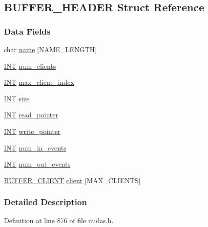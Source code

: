 \subsection{BUFFER\_\-HEADER Struct Reference}
\label{structBUFFER__HEADER}
\subsubsection*{Data Fields}
\begin{DoxyCompactItemize}
\item 
char \hyperlink{structBUFFER__HEADER_a40ea1b56ee55965c4d61e6da5ae57022}{name} \mbox{[}NAME\_\-LENGTH\mbox{]}
\item 
\hyperlink{vppg_8h_a392e62da233ed3e2f7c3fd4f487a3896}{INT} \hyperlink{structBUFFER__HEADER_a3c6af0363e3034c956a264fe6a25ddfb}{num\_\-clients}
\item 
\hyperlink{vppg_8h_a392e62da233ed3e2f7c3fd4f487a3896}{INT} \hyperlink{structBUFFER__HEADER_a5af9f52955602868b5b9161580fa810d}{max\_\-client\_\-index}
\item 
\hyperlink{vppg_8h_a392e62da233ed3e2f7c3fd4f487a3896}{INT} \hyperlink{structBUFFER__HEADER_adedca43a59b3dd2c5cf10cff01dc46a3}{size}
\item 
\hyperlink{vppg_8h_a392e62da233ed3e2f7c3fd4f487a3896}{INT} \hyperlink{structBUFFER__HEADER_add4be4a3e858fc79d67f2625c1771874}{read\_\-pointer}
\item 
\hyperlink{vppg_8h_a392e62da233ed3e2f7c3fd4f487a3896}{INT} \hyperlink{structBUFFER__HEADER_a3431c98c823dc22dc046a947bd9675eb}{write\_\-pointer}
\item 
\hyperlink{vppg_8h_a392e62da233ed3e2f7c3fd4f487a3896}{INT} \hyperlink{structBUFFER__HEADER_a1cb3b9436d59dba0946de51581e68fbd}{num\_\-in\_\-events}
\item 
\hyperlink{vppg_8h_a392e62da233ed3e2f7c3fd4f487a3896}{INT} \hyperlink{structBUFFER__HEADER_a945ea5f8272cf66bfe20e68a0b86b599}{num\_\-out\_\-events}
\item 
\hyperlink{structBUFFER__CLIENT}{BUFFER\_\-CLIENT} \hyperlink{structBUFFER__HEADER_a7bf4fa88ab9e4791b3357210c0422946}{client} \mbox{[}MAX\_\-CLIENTS\mbox{]}
\end{DoxyCompactItemize}


\subsubsection{Detailed Description}


Definition at line 876 of file midas.h.

